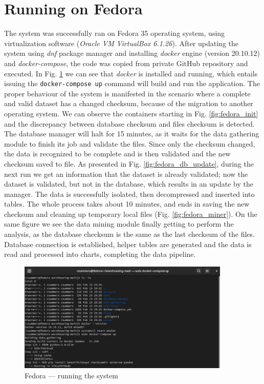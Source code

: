 \section{Running on Fedora}
The system was successfully ran on Fedora 35 operating system, using virtualization software (\textit{Oracle VM VirtualBox 6.1.26}). After updating the system using \textit{dnf} package manager and installing \textit{docker} engine (version 20.10.12) and \textit{docker-compose}, the code was copied from private GitHub repository and executed. In Fig. \ref{fig:fedora} we can see that \textit{docker} is installed and running, which entails issuing the \texttt{docker-compose up} command will build and run the application. The proper behaviour of the system is manifested in the scenario where a complete and valid dataset has a changed checksum, because of the migration to another operating system. We can observe the containers starting in Fig. \ref{fig:fedora_init} and the discrepancy between database checksum and files checksum is detected. The database manager will halt for 15 minutes, as it waits for the data gathering module to finish its job and validate the files. Since only the checksum changed, the data is recognized to be complete and is then validated and the new checksum saved to file. As presented in Fig. \ref{fig:fedora_db_update}, during the next run we get an information that the dataset is already validated; now the dataset is validated, but not in the database, which results in an update by the manager. The data is successfully isolated, then decompressed and inserted into tables. The whole process takes about 10 minutes, and ends in saving the new checksum and cleaning up temporary local files (Fig. \ref{fig:fedora_miner}). On the same figure we see the data mining module finally getting to perform the analysis, as the database checksum is the same as the last checksum of the files. Database connection is established, helper tables are generated and the data is read and processed into charts, completing the data pipeline.

\begin{figure}[ht]
    \centering
    \includegraphics[width=0.9\textwidth]{figures/fedora.png}
    \caption{Fedora --- running the system}
    \label{fig:fedora}
\end{figure}

